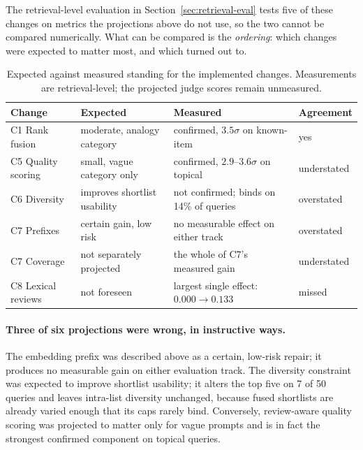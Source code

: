 The retrieval-level evaluation in Section~\ref{sec:retrieval-eval} tests five of
these changes on metrics the projections above do not use, so the two cannot be
compared numerically. What can be compared is the \emph{ordering}: which changes
were expected to matter most, and which turned out to.

\begin{table}[h]
\centering
\caption{Expected against measured standing for the implemented changes.
Measurements are retrieval-level; the projected judge scores remain unmeasured.}
\label{tab:projection-vs-measurement}
\small
\begin{tabular}{llll}
\hline
\textbf{Change} & \textbf{Expected} & \textbf{Measured} & \textbf{Agreement} \\
\hline
C1 Rank fusion        & moderate, analogy category   & confirmed, $3.5\sigma$ on known-item & yes \\
C5 Quality scoring    & small, vague category only   & confirmed, $2.9$--$3.6\sigma$ on topical & understated \\
C6 Diversity          & improves shortlist usability & not confirmed; binds on 14\% of queries & overstated \\
C7 Prefixes           & certain gain, low risk       & no measurable effect on either track & overstated \\
C7 Coverage           & not separately projected     & the whole of C7's measured gain & understated \\
C8 Lexical reviews    & not foreseen                 & largest single effect: $0.000 \rightarrow 0.133$ & missed \\
\hline
\end{tabular}
\end{table}

\paragraph{Three of six projections were wrong, in instructive ways.}
The embedding prefix was described above as a certain, low-risk repair; it
produces no measurable gain on either evaluation track. The diversity
constraint was expected to improve shortlist usability; it alters the top five
on 7 of 50 queries and leaves intra-list diversity unchanged, because fused
shortlists are already varied enough that its caps rarely bind. Conversely,
review-aware quality scoring was projected to matter only for vague prompts and
is in fact the strongest confirmed component on topical queries.


